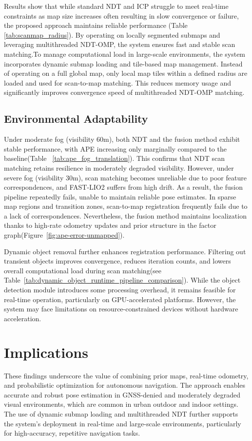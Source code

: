 Results show that while standard NDT and ICP struggle to meet real-time constraints as map size  increases often resulting in slow convergence or failure, the proposed approach maintains reliable performance (Table \ref{tab:scanmap_radius}). By operating on locally segmented submaps and leveraging multithreaded NDT-OMP, the system ensures fast and stable scan matching.To manage computational load in large-scale environments, the system incorporates dynamic submap loading and tile-based map management. Instead of operating on a full global map, only local map tiles within a defined radius are loaded and used for scan-to-map matching. This reduces memory usage and significantly improves convergence speed of multithreaded NDT-OMP matching.

\subsection{Environmental Adaptability }
Under moderate fog (visibility {60}{m}), both NDT and the fusion method exhibit stable performance, with {APE} increasing only marginally compared to the baseline(Table ~\ref{tab:ape_fog_translation}). This confirms that {NDT} scan matching retains resilience in moderately degraded visibility. However, under severe fog ({visibility 30}{m}), scan matching becomes unreliable due to poor feature correspondences, and {FAST-LIO2} suffers from high drift. As a result, the fusion pipeline repeatedly fails, unable to maintain reliable pose estimates. In sparse map regions and transition zones, scan-to-map registration frequently fails due to a lack of correspondences. Nevertheless, the fusion method maintains localization thanks to high-rate odometry updates and prior structure in the factor graph(Figure~\ref{fig:ape-error-unmapped}).

Dynamic object removal further enhances registration performance. Filtering out transient objects improves convergence, reduces iteration counts, and lowers overall computational load during scan matching(see Table~\ref{tab:dynamic_object_runtime_pipeline_comparison}). While the object detection module introduces some processing overhead, it remains feasible for real-time operation, particularly on GPU-accelerated platforms. However, the system may face limitations on resource-constrained devices without hardware acceleration.

\section{Implications}
These findings underscore the value of combining prior maps, real-time odometry, and probabilistic optimization for autonomous navigation. The approach enables accurate and robust pose estimation in GNSS-denied and moderately degraded visual environments, which are common in urban outdoor and indoor settings. The use of dynamic submap loading and multithreaded NDT further supports the system’s deployment in real-time and large-scale environments, particularly for high-accuracy, repetitive navigation tasks.

